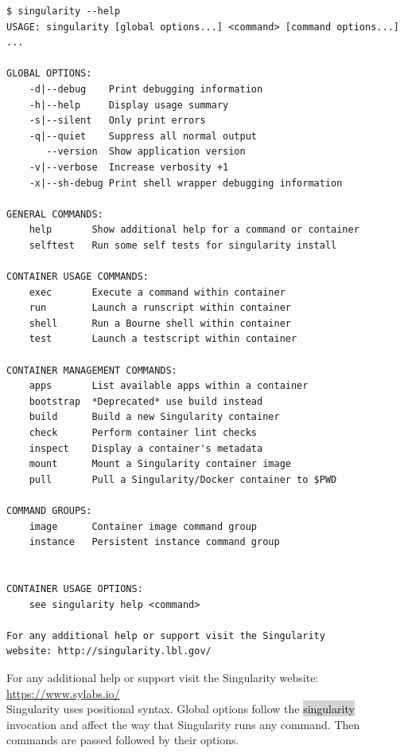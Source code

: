 \documentclass[a4paper]{article}
\begin{document}
\begin{lstlisting}[frame=single]  
$ singularity --help
USAGE: singularity [global options...] <command> [command options...] ...

GLOBAL OPTIONS:
    -d|--debug    Print debugging information
    -h|--help     Display usage summary
    -s|--silent   Only print errors
    -q|--quiet    Suppress all normal output
       --version  Show application version
    -v|--verbose  Increase verbosity +1
    -x|--sh-debug Print shell wrapper debugging information

GENERAL COMMANDS:
    help       Show additional help for a command or container                  
    selftest   Run some self tests for singularity install                      

CONTAINER USAGE COMMANDS:
    exec       Execute a command within container                               
    run        Launch a runscript within container                              
    shell      Run a Bourne shell within container                              
    test       Launch a testscript within container                             

CONTAINER MANAGEMENT COMMANDS:
    apps       List available apps within a container                           
    bootstrap  *Deprecated* use build instead                                   
    build      Build a new Singularity container                                
    check      Perform container lint checks                                    
    inspect    Display a container's metadata                                   
    mount      Mount a Singularity container image                              
    pull       Pull a Singularity/Docker container to $PWD                      

COMMAND GROUPS:
    image      Container image command group                                    
    instance   Persistent instance command group                                


CONTAINER USAGE OPTIONS:
    see singularity help <command>

For any additional help or support visit the Singularity
website: http://singularity.lbl.gov/
\end{lstlisting}


For any additional help or support visit the Singularity
website: \href{https://www.sylabs.io/}{https://www.sylabs.io/}\\

Singularity uses positional syntax. Global options follow the \colorbox{lightgray}{singularity} invocation and affect the way that Singularity runs any command. Then commands are passed followed by their options.\\
\end{document}
